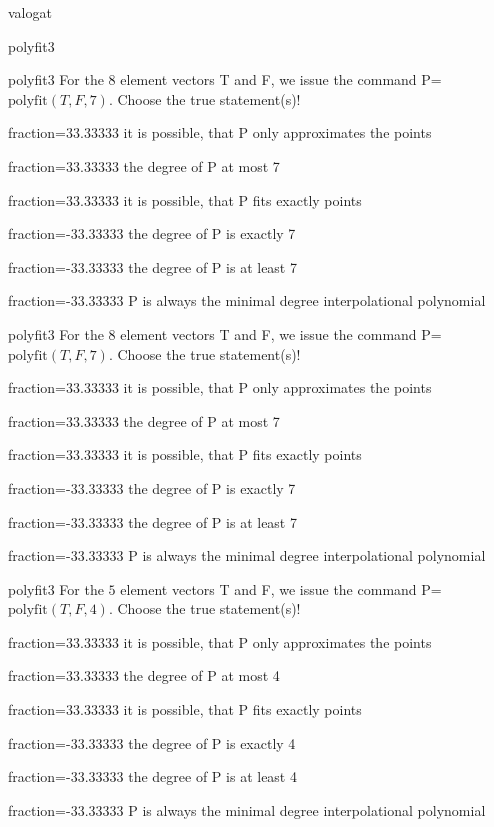 \documentclass[12pt]{article}
\begin{document}
\begin{quiz}{valogat}
\begin{multi}[single=false]{polyfit3}
\end{multi}
\begin{multi}[single=false]{polyfit3}
For the $8$ element vectors T and F, we issue the command P=$\mathrm{polyfit}(T,F,7)$.
Choose the true statement(s)!
\item[fraction=33.33333] it is possible, that P only approximates the points
\item[fraction=33.33333] the degree of P at most 7
\item[fraction=33.33333] it is possible, that P fits exactly points
\item[fraction=-33.33333]  the degree of P is exactly 7
\item[fraction=-33.33333]  the degree of P is at least 7
\item[fraction=-33.33333]  P is always the minimal degree interpolational polynomial
\end{multi}
\begin{multi}[single=false]{polyfit3}
For the $8$ element vectors T and F, we issue the command P=$\mathrm{polyfit}(T,F,7)$.
Choose the true statement(s)!
\item[fraction=33.33333] it is possible, that P only approximates the points
\item[fraction=33.33333] the degree of P at most 7
\item[fraction=33.33333] it is possible, that P fits exactly points
\item[fraction=-33.33333]  the degree of P is exactly 7
\item[fraction=-33.33333]  the degree of P is at least 7
\item[fraction=-33.33333]  P is always the minimal degree interpolational polynomial
\end{multi}
\begin{multi}[single=false]{polyfit3}
For the $5$ element vectors T and F, we issue the command P=$\mathrm{polyfit}(T,F,4)$.
Choose the true statement(s)!
\item[fraction=33.33333] it is possible, that P only approximates the points
\item[fraction=33.33333] the degree of P at most 4
\item[fraction=33.33333] it is possible, that P fits exactly points
\item[fraction=-33.33333]  the degree of P is exactly 4
\item[fraction=-33.33333]  the degree of P is at least 4
\item[fraction=-33.33333]  P is always the minimal degree interpolational polynomial

\end{multi}
\end{quiz}
\end{document}
